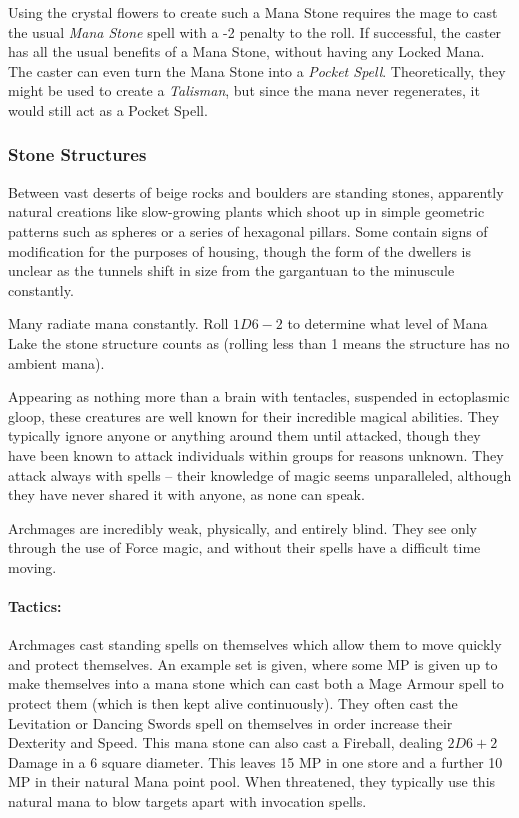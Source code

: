 \begin{multicols}{2}
Using the crystal flowers to create such a Mana Stone requires the mage to cast the usual \textit{Mana Stone} spell with a -2 penalty to the roll.
If successful, the caster has all the usual benefits of a Mana Stone, without having any Locked Mana.
The caster can even turn the Mana Stone into a \textit{Pocket Spell}.
Theoretically, they might be used to create a \textit{Talisman}, but since the mana never regenerates, it would still act as a Pocket Spell.

\boxPair[t]{
  \archmage
}{
  \rockman
}

\subsubsection{Stone Structures}

Between vast deserts of beige rocks and boulders are standing stones, apparently natural creations like slow-growing plants which shoot up in simple geometric patterns such as spheres or a series of hexagonal pillars.
Some contain signs of modification for the purposes of housing, though the form of the dwellers is unclear as the tunnels shift in size from the gargantuan to the minuscule constantly.

Many radiate mana constantly.
Roll $1D6-2$ to determine what level of Mana Lake the stone structure counts as (rolling less than 1 means the structure has no ambient mana).

\label{archmage}

Appearing as nothing more than a brain with tentacles, suspended in ectoplasmic gloop, these creatures are well known for their incredible magical abilities.
They typically ignore anyone or anything around them until attacked, though they have been known to attack individuals within groups for reasons unknown.
They attack always with spells -- their knowledge of magic seems unparalleled, although they have never shared it with anyone, as none can speak.

Archmages are incredibly weak, physically, and entirely blind.
They see only through the use of Force magic, and without their spells have a difficult time moving.

\paragraph{Tactics:} Archmages cast standing spells on themselves which allow them to move quickly and protect themselves.
An example set is given, where some MP is given up to make themselves into a mana stone which can cast both a Mage Armour spell to protect them (which is then kept alive continuously).
They often cast the Levitation or Dancing Swords spell on themselves in order increase their Dexterity and Speed.
This mana stone can also cast a Fireball, dealing $2D6+2$ Damage in a 6 square diameter.
This leaves 15 MP in one store and a further 10 MP in their natural Mana point pool.
When threatened, they typically use this natural mana to blow targets apart with invocation spells.


\end{multicols}
